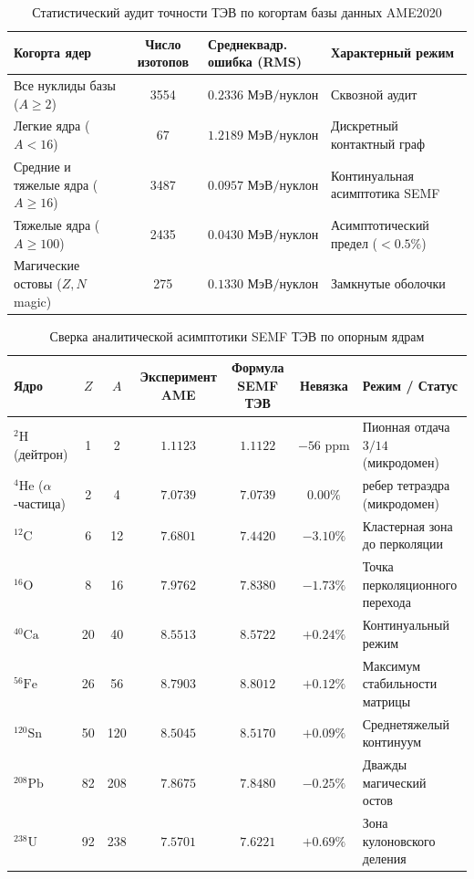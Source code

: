 \documentclass[11pt,a4paper]{article}
\theoremstyle{definition}
\theoremstyle{remark}
\begin{document}
\begin{table}[H]
\centering
\small
\setlength{\tabcolsep}{5pt}
\caption{Статистический аудит точности ТЭВ по когортам базы данных AME2020}
\label{tab:ame2020_statistical_audit}
\vspace{2mm}
\begin{tabularx}{\textwidth}{>{\raggedright\arraybackslash}p{4.5cm} c >{\centering\arraybackslash}p{3.0cm} >{\centering\arraybackslash}X}
	\toprule
	Когорта ядер & Число изотопов & Среднеквадр. ошибка (RMS) & Характерный режим \\
	\midrule
Все нуклиды базы ($A \ge 2$) & 3554 & $0.2336\text{ МэВ/нуклон}$ & Сквозной аудит \\
Легкие ядра ($A < 16$) & 67 & $1.2189\text{ МэВ/нуклон}$ & Дискретный контактный граф \\
Средние и тяжелые ядра ($A \ge 16$) & 3487 & $0.0957\text{ МэВ/нуклон}$ & Континуальная асимптотика SEMF \\
Тяжелые ядра ($A \ge 100$) & 2435 & $0.0430\text{ МэВ/нуклон}$ & Асимптотический предел ($< 0.5\%$) \\
Магические остовы ($Z, N$ magic) & 275 & $0.1330\text{ МэВ/нуклон}$ & Замкнутые оболочки \\
\bottomrule
\end{tabularx}
\end{table}

\begin{table}[H]
\centering
\small
\setlength{\tabcolsep}{4pt}
\caption{Сверка аналитической асимптотики SEMF ТЭВ по опорным ядрам}
\label{tab:benchmarks_ame2020}
\vspace{2mm}
\begin{tabularx}{\textwidth}{l c c c c c >{\raggedright\arraybackslash}X}
\toprule
Ядро & $Z$ & $A$ & Эксперимент AME & Формула SEMF ТЭВ & Невязка & Режим / Статус \\
\midrule
	$^2\mathrm{H}$ (дейтрон) & 1 & 2 & $1.1123$ & $1.1122$ & $-56\text{ ppm}$ & Пионная отдача $3/14$ (микродомен) \\
	$^4\mathrm{He}$ ($\alpha$-частица) & 2 & 4 & $7.0739$ & $7.0739$ & $0.00\%$ & 6 ребер тетраэдра (микродомен) \\
	$^{12}\mathrm{C}$ & 6 & 12 & $7.6801$ & $7.4420$ & $-3.10\%$ & Кластерная зона до перколяции \\
	$^{16}\mathrm{O}$ & 8 & 16 & $7.9762$ & $7.8380$ & $-1.73\%$ & Точка перколяционного перехода \\
	$^{40}\mathrm{Ca}$ & 20 & 40 & $8.5513$ & $8.5722$ & $+0.24\%$ & Континуальный режим \\
	$^{56}\mathrm{Fe}$ & 26 & 56 & $8.7903$ & $8.8012$ & $+0.12\%$ & Максимум стабильности матрицы \\
	$^{120}\mathrm{Sn}$ & 50 & 120 & $8.5045$ & $8.5170$ & $+0.09\%$ & Среднетяжелый континуум \\
	$^{208}\mathrm{Pb}$ & 82 & 208 & $7.8675$ & $7.8480$ & $-0.25\%$ & Дважды магический остов \\
	$^{238}\mathrm{U}$ & 92 & 238 & $7.5701$ & $7.6221$ & $+0.69\%$ & Зона кулоновского деления \\
\bottomrule
\end{tabularx}
\end{table}
\end{document}
